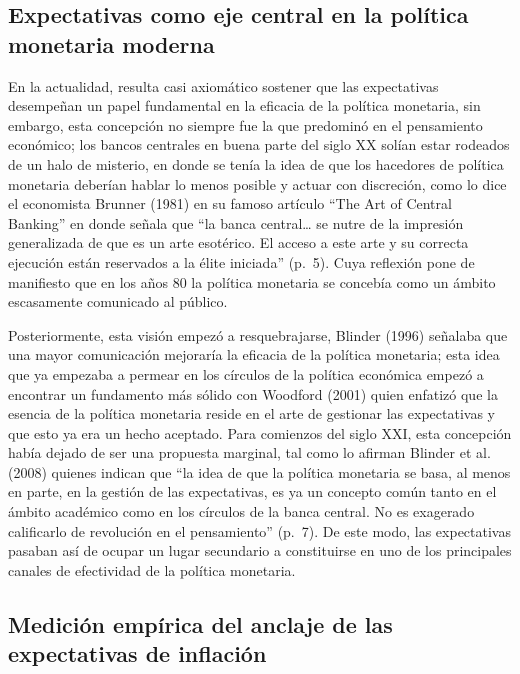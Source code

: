 \documentclass[
  10.5pt,
  letterpaper,
  twocolumn]{article}
\begin{document}
\subsection{Expectativas como eje central en la política monetaria
moderna}\label{expectativas-como-eje-central-en-la-poluxedtica-monetaria-moderna}

En la actualidad, resulta casi axiomático sostener que las expectativas
desempeñan un papel fundamental en la eficacia de la política monetaria,
sin embargo, esta concepción no siempre fue la que predominó en el
pensamiento económico; los bancos centrales en buena parte del siglo XX
solían estar rodeados de un halo de misterio, en donde se tenía la idea
de que los hacedores de política monetaria deberían hablar lo menos
posible y actuar con discreción, como lo dice el economista Brunner
(1981) en su famoso artículo ``The Art of Central Banking'' en donde
señala que ``la banca central\ldots{} se nutre de la impresión
generalizada de que es un arte esotérico. El acceso a este arte y su
correcta ejecución están reservados a la élite iniciada'' (p.~5). Cuya
reflexión pone de manifiesto que en los años 80 la política monetaria se
concebía como un ámbito escasamente comunicado al público.

Posteriormente, esta visión empezó a resquebrajarse, Blinder (1996)
señalaba que una mayor comunicación mejoraría la eficacia de la política
monetaria; esta idea que ya empezaba a permear en los círculos de la
política económica empezó a encontrar un fundamento más sólido con
Woodford (2001) quien enfatizó que la esencia de la política monetaria
reside en el arte de gestionar las expectativas y que esto ya era un
hecho aceptado. Para comienzos del siglo XXI, esta concepción había
dejado de ser una propuesta marginal, tal como lo afirman Blinder et al.
(2008) quienes indican que ``la idea de que la política monetaria se
basa, al menos en parte, en la gestión de las expectativas, es ya un
concepto común tanto en el ámbito académico como en los círculos de la
banca central. No es exagerado calificarlo de revolución en el
pensamiento'' (p.~7). De este modo, las expectativas pasaban así de
ocupar un lugar secundario a constituirse en uno de los principales
canales de efectividad de la política monetaria.

\subsection{Medición empírica del anclaje de las expectativas de
inflación}\label{mediciuxf3n-empuxedrica-del-anclaje-de-las-expectativas-de-inflaciuxf3n}
\end{document}
